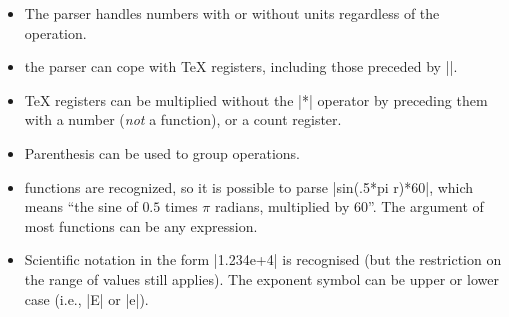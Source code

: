 \begin{command}{\pgfmathparse{}}
\begin{itemize}
  \item The parser handles numbers with or without units regardless
    of the operation.

\begin{codeexample}[post=\tt\footnotesize\pgfmathresult]
\end{codeexample}

  \item the parser can cope with \TeX{} registers, including those 
    preceded by |\the|.

    \makeatletter

\begin{codeexample}[post=\tt\footnotesize\pgfmathresult]
\pgf@x=12.34pt
\end{codeexample}

\begin{codeexample}[post=\tt\footnotesize\pgfmathresult]
\pgf@x=56.78pt
\pgfmathparse{\pgf@x+\the\pgf@x}
\end{codeexample}

  \item \TeX{} registers can be multiplied without the |*| operator
    by preceding them with a number (\emph{not} a function), or a
    count register.
	 
\begin{codeexample}[post=\tt\footnotesize\pgfmathresult]
\pgf@x=10pt
%
\end{codeexample}

  \item Parenthesis can be used to group operations.

\begin{codeexample}[post=\tt\footnotesize\pgfmathresult]
\end{codeexample}

  \item functions are recognized, so it is possible to parse
    |sin(.5*pi r)*60|, which means ``the sine of $0.5$ times $\pi$ 
    radians, multiplied by 60''. The argument of most functions can
    be any expression.

\begin{codeexample}[post=\tt\footnotesize\pgfmathresult]
\end{codeexample}

  \item Scientific notation in the form |1.234e+4| is recognised (but
  the restriction on the range of values still applies). The exponent
  symbol can be upper or lower case (i.e., |E| or |e|). 
  
\begin{codeexample}[post=\tt\footnotesize\pgfmathresult]
\end{codeexample}
\begin{codeexample}[post=\tt\footnotesize\pgfmathresult]
\end{codeexample}
  \end{itemize}
\end{command}


